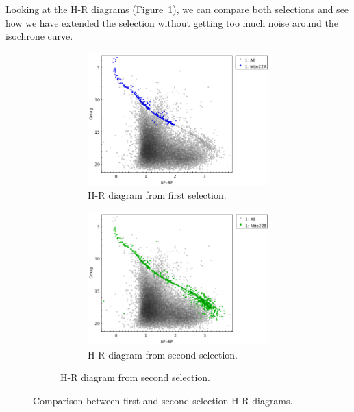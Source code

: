\documentclass[11pt, a4paper, english]{book}
\begin{document}
Looking at the H-R diagrams (Figure~\ref{fig:clusterix_selection_hr_diagrams_melotte_22}),
we can compare both selections and see how we have extended the selection without
getting too much noise around the isochrone curve.

\begin{figure}[htbp]
  \centering
  \begin{subfigure}{0.9\textwidth}
    \centering
    \begin{subfigure}[t]{0.45\textwidth}
      \centering
      \includegraphics[width=\textwidth]{../figures/clusterix/topcat_1st_selection_hr_diagram_melotte_22.png}
      \caption{H-R diagram from first selection.}
    \end{subfigure}
    \hfill
    \begin{subfigure}[t]{0.45\textwidth}
      \centering
      \includegraphics[width=\textwidth]{../figures/clusterix/topcat_2nd_selection_hr_diagram_melotte_22.png}
      \caption{H-R diagram from second selection.}
    \end{subfigure}
  \end{subfigure}
  \caption{Comparison between first and second selection H-R diagrams.}
  \label{fig:clusterix_selection_hr_diagrams_melotte_22}
\end{figure}
\end{document}
